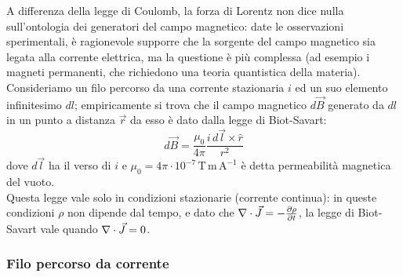 A differenza della legge di Coulomb, la forza di Lorentz non dice nulla sull'ontologia dei generatori del campo magnetico: date le osservazioni sperimentali, è ragionevole supporre che la sorgente del campo magnetico sia legata alla corrente elettrica, ma la questione è più complessa (ad esempio i magneti permanenti, che richiedono una teoria quantistica della materia). \\ 
%
Consideriamo un filo percorso da una corrente stazionaria $ i $ ed un suo elemento infinitesimo $ dl $; empiricamente si trova che il campo magnetico $ d\vec{B} $ generato da $ dl $ in un punto a distanza $ \vec{r} $ da esso è dato dalla legge di Biot-Savart:
\begin{equation}
	d\vec{B} = \displaystyle\frac{\mu_0}{4\pi} \displaystyle\frac{i \, d\vec{l} \times \hat{r}}{r^2}
	\label{eq:biot-savart}
\end{equation}
dove $ d\vec{l} $ ha il verso di $ i $ e $ \mu_0 = 4\pi \cdot 10^{-7} \, \text{T} \, \text{m} \, \text{A}^{-1} $ è detta permeabilità magnetica del vuoto. \\ 
%
Questa legge vale solo in condizioni stazionarie (corrente continua): in queste condizioni $ \rho $ non dipende dal tempo, e dato che $ \nabla\cdot\vec{J} = -\frac{\partial \rho}{\partial t} $, la legge di Biot-Savart vale quando $ \nabla\cdot\vec{J} = 0 $.

\subsubsection{Filo percorso da corrente}

